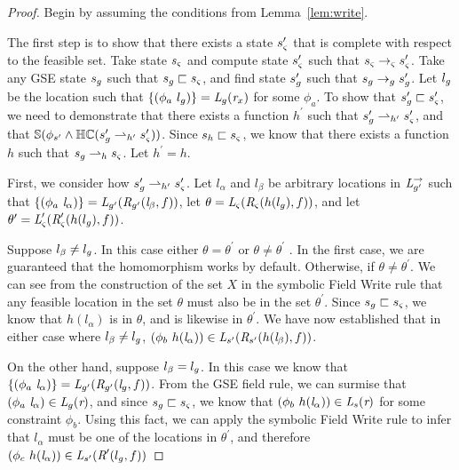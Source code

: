 \begin{proof}
Begin by assuming the conditions from Lemma~\ref{lem:write}.

The first step is to show that there exists a state $s_{\varsigma}^\prime$ that is complete with respect to the feasible set. Take state $s_{\varsigma}$ and compute state $s_{\varsigma}^\prime$ such that $s_{\varsigma} \rightarrow_{\varsigma} s_{\varsigma}^\prime$. Take any GSE state $s_{g}$ such that $s_{g} \sqsubset s_{\varsigma}$, and find state $s_{g}^\prime$ such that $s_{g} \rightarrow_{g} s_{g}^\prime$. Let $l_{g}$ be the location such that $\{(\phi_a\ l_{g} )\} = \emph{L}_{g}(\emph{r}_x) $ for some $\phi_a$. To show that $s_{g}^\prime \sqsubset s_{\varsigma}^\prime$, we need to demonstrate that there exists a function $h^\prime$ such that $s_{g}^\prime \rightharpoonup_{h^\prime} s_{\varsigma}^\prime$, and that $\mathbb{S}(\phi_{s^\prime} \wedge \mathbb{HC}(s_{g}^\prime \rightharpoonup_{h^\prime} s_{\varsigma}^\prime) )$. Since $s_h \sqsubset s_{\varsigma}$, we know that there exists a function $h$ such that $s_{g} \rightharpoonup_{h} s_{\varsigma}$. Let $h^\prime = h$. 

First, we consider how $s_{g}^\prime \rightharpoonup_{h^\prime} s_{\varsigma}^\prime$. Let $l_\alpha$ and $l_\beta$ be arbitrary locations in $\emph{L}_{g^\prime}^\rightarrow$ such that $\{(\phi_a\ \emph{l}_\alpha)\} = \emph{L}_{g^\prime}(\emph{R}_{g^\prime}(\emph{l}_\beta,f ))$, let $\theta = \emph{L}_{\varsigma}(\emph{R}_{\varsigma}(h(l_{g}),f))$, and let $\theta^\prime =   \emph{L}_{\varsigma}^\prime(\emph{R}_{\varsigma}^\prime(h(l_{g}),f))$. 

Suppose $l_\beta \neq l_{g}$. In this case either $\theta = \theta^\prime$ or $\theta \neq \theta^\prime$ . In the first case, we are guaranteed that the homomorphism works by default. Otherwise, if $\theta \neq \theta^\prime$.  We can see from the construction of the set $X$ in the symbolic Field Write rule that any feasible location in the set $\theta$ must also be in the set $\theta^\prime$. Since $s_{g} \sqsubset s_{\varsigma}$, we know that $h(l_\alpha)$ is in $\theta$, and is likewise in $\theta^\prime$. We have now established that in either case where $l_\beta \neq l_{g}$, $(\phi_b\ h(\emph{l}_\alpha))\in \emph{L}_{s^\prime}(\emph{R}_{s^\prime} (h(\emph{l}_\beta),f ))$.

On the other hand, suppose $l_\beta = l_{g}$. In this case we know that $\{(\phi_a\ \emph{l}_\alpha)\} = \emph{L}_{g^\prime}(\emph{R}_{g^\prime}(\emph{l}_{g},f ))$. From the GSE field rule, we can surmise that $(\phi_a\ \emph{l}_\alpha) \in \emph{L}_{g}(\emph{r} )$, and since $s_{g} \sqsubset s_{\varsigma}$, we know that $(\phi_b\ h(\emph{l}_\alpha)) \in \emph{L}_{s}(\emph{r})$ for some constraint $\phi_b$. Using this fact, we can apply the symbolic Field Write rule to infer that $l_\alpha$ must be one of the locations in $\theta^\prime$, and therefore $(\phi_c\ h(\emph{l}_\alpha)) \in \emph{L}_{s^\prime}(\emph{R}^\prime(l_{g},f))$


\end{proof}
